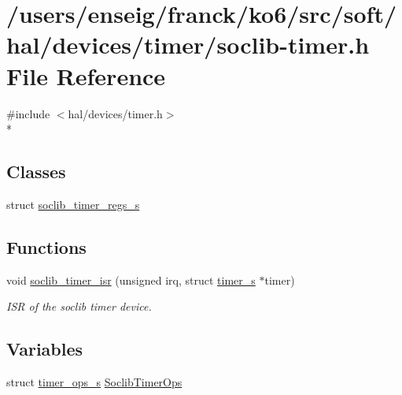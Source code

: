 \hypertarget{soclib-timer_8h}{\section{/users/enseig/franck/ko6/src/soft/hal/devices/timer/soclib-\/timer.h File Reference}
\label{soclib-timer_8h}
}
{\ttfamily \#include $<$hal/devices/timer.\-h$>$}\\*
\subsection*{Classes}
\begin{DoxyCompactItemize}
\item 
struct \hyperlink{structsoclib__timer__regs__s}{soclib\-\_\-timer\-\_\-regs\-\_\-s}
\end{DoxyCompactItemize}
\subsection*{Functions}
\begin{DoxyCompactItemize}
\item 
void \hyperlink{soclib-timer_8h_ad4d0316e8dbbe5427118ba5a8a03f12d}{soclib\-\_\-timer\-\_\-isr} (unsigned irq, struct \hyperlink{structtimer__s}{timer\-\_\-s} $\ast$timer)
\begin{DoxyCompactList}\small\item\em I\-S\-R of the soclib timer device. \end{DoxyCompactList}\end{DoxyCompactItemize}
\subsection*{Variables}
\begin{DoxyCompactItemize}
\item 
struct \hyperlink{structtimer__ops__s}{timer\-\_\-ops\-\_\-s} \hyperlink{soclib-timer_8h_aa3f96a0578c32ac8fd0d3b2526182084}{Soclib\-Timer\-Ops}
\end{DoxyCompactItemize}


